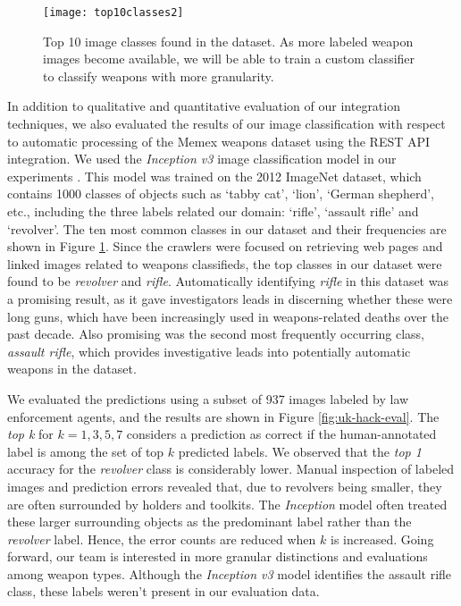 \begin{figure}
	\texttt{[image: top10classes2]}
	\caption{Top 10 image classes found in the dataset. As more labeled weapon images become available, we will be able to train a custom classifier to classify weapons with more granularity.}
	\label{fig:top10ImgClass}
\end{figure}


In addition to qualitative and quantitative evaluation of our integration techniques, we also evaluated the results of our image classification with respect to automatic processing of the Memex weapons dataset using the REST API integration.  We used the \textit{Inception v3} image classification model in our experiments \cite{SzegedyVISW15}. This model was trained on the 2012 ImageNet dataset, which contains 1000 classes of objects such as `tabby cat', `lion', `German shepherd', etc.,\cite{LSVRC12Synsets, ILSVRC15} including the three labels related our domain: `rifle', `assault rifle' and `revolver'. The ten most common classes in our dataset and their frequencies are shown in Figure \ref{fig:top10ImgClass}. Since the crawlers were focused on retrieving web pages and linked images related to weapons classifieds, the top classes in our dataset were found to be \textit{revolver} and \textit{rifle}. Automatically identifying \textit{rifle} in this dataset was a promising result, as it gave investigators leads in discerning whether these were long guns, which have been increasingly used in weapons-related deaths over the past decade. Also promising was the second most frequently occurring class, \textit{assault rifle}, which provides investigative leads into potentially automatic weapons in the dataset.

We evaluated the predictions using a subset of 937 images labeled by law enforcement agents, and the results are shown in Figure \ref{fig:uk-hack-eval}. The \textit{top k} for $k=1,3,5,7$ considers a prediction as correct if the human-annotated label is among the set of top $k$  predicted labels. We observed that the \textit{top 1} accuracy for the \textit{revolver} class is considerably lower. Manual inspection of labeled images and prediction errors revealed that, due to revolvers being smaller, they are often surrounded by holders and toolkits. The \textit{Inception} model often treated these larger surrounding objects as the predominant label rather than the \textit{revolver} label. Hence, the error counts are reduced when $k$ is increased. Going forward, our team is interested in more granular distinctions and evaluations among weapon types. Although the \textit{Inception v3} model identifies the assault rifle class, these labels weren't present in our evaluation data. 

